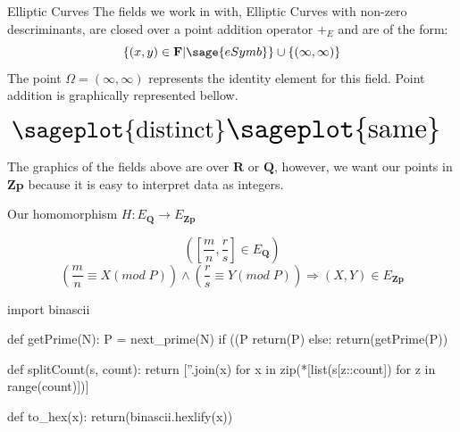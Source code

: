 \documentclass[a0,portrait]{a0poster}
\begin{document}
\begin{multicols}{2}
\begin{slide}{Elliptic Curves}
  The fields we work in with, Elliptic Curves with non-zero descriminants, are closed over a point addition operator $+_E$ and are of the form:
  \[\left\{(x,y)\in\mathbf{F}|\sage{eSymb}\right\}\cup\left\{(\infty,\infty)\right\}\]
  The point $\Omega = (\infty,\infty)$ represents the identity element for this field.  
  Point addition is graphically represented bellow.
  
  \begin{center}
    \begin{align*}
      \resizebox{0.5\columnwidth}{!}{\sageplot{distinct}}&
      \resizebox{0.5\columnwidth}{!}{\sageplot{same}}
    \end{align*}
  \end{center}

The graphics of the fields above are over $\mathbf{R}$ or $\mathbf{Q}$,
however, we want our points in $\mathbf{Zp}$ because it is easy to interpret data as integers.

Our homomorphism $H:E_\mathbf{Q} \rightarrow E_\mathbf{Zp}$ 

\[(\left[\frac{m}{n},\frac{r}{s}\right] \in E_\mathbf{Q})\]
\[\left(\frac{m}{n} \equiv X (mod\; P)\right)\wedge \left(\frac{r}{s} \equiv Y (mod\; P) \right)\Rightarrow (X,Y)\in E_\mathbf{Zp}\]

\end{slide}

\begin{sagesilent}
  import binascii

  def getPrime(N):
      P = next_prime(N) 
      if ((P %
         return(P)
      else:
         return(getPrime(P))

  def splitCount(s, count):
     return [''.join(x) for x in zip(*[list(s[z::count]) for z in range(count)])]
          
  def to_hex(x):
      return(binascii.hexlify(x))


\end{sagesilent}
\end{multicols}
\end{document}
